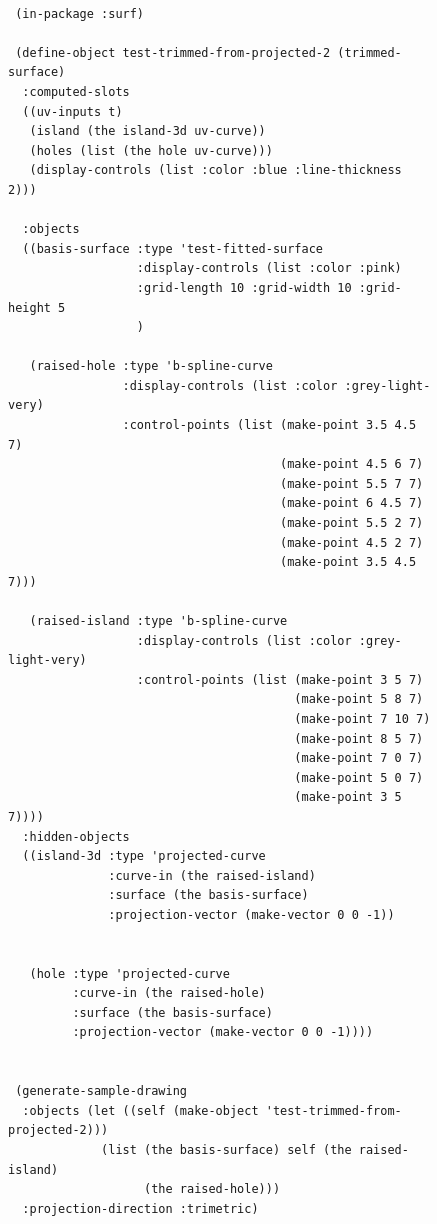 \documentclass [11pt]{book}
\begin{document}
\begin{itemize}
\begin{description}
\end{description}




\begin{figure}
\begin{lrbox}{\boxedverb}
\begin{minipage}{\linewidth}
{\small

\begin{verbatim}

 (in-package :surf)

 (define-object test-trimmed-from-projected-2 (trimmed-surface)
  :computed-slots
  ((uv-inputs t)
   (island (the island-3d uv-curve))
   (holes (list (the hole uv-curve)))
   (display-controls (list :color :blue :line-thickness 2)))
  
  :objects
  ((basis-surface :type 'test-fitted-surface
                  :display-controls (list :color :pink)
                  :grid-length 10 :grid-width 10 :grid-height 5
                  )
   
   (raised-hole :type 'b-spline-curve
                :display-controls (list :color :grey-light-very)
                :control-points (list (make-point 3.5 4.5 7)
                                      (make-point 4.5 6 7) 
                                      (make-point 5.5 7 7) 
                                      (make-point 6 4.5 7) 
                                      (make-point 5.5 2 7) 
                                      (make-point 4.5 2 7) 
                                      (make-point 3.5 4.5 7)))

   (raised-island :type 'b-spline-curve
                  :display-controls (list :color :grey-light-very)
                  :control-points (list (make-point 3 5 7)
                                        (make-point 5 8 7) 
                                        (make-point 7 10 7) 
                                        (make-point 8 5 7) 
                                        (make-point 7 0 7) 
                                        (make-point 5 0 7) 
                                        (make-point 3 5 7))))
  :hidden-objects
  ((island-3d :type 'projected-curve
              :curve-in (the raised-island)
              :surface (the basis-surface)
              :projection-vector (make-vector 0 0 -1))
   

   (hole :type 'projected-curve
         :curve-in (the raised-hole)
         :surface (the basis-surface)
         :projection-vector (make-vector 0 0 -1))))


 (generate-sample-drawing 
  :objects (let ((self (make-object 'test-trimmed-from-projected-2)))
             (list (the basis-surface) self (the raised-island) 
                   (the raised-hole)))
  :projection-direction :trimetric)
 


\end{verbatim}}
\end{minipage}
\end{lrbox}
\end{figure}
\end{itemize}
\end{document}
